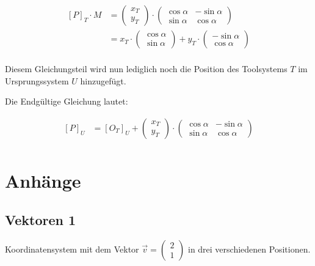 \documentclass{article}
\newcommand{\m}[1]{\begin{pmatrix}#1\end{pmatrix}}
\begin{document}
    \[
        \begin{split}
            {[P]}_{T} \cdot M &= \m{x_T \\ y_T} \cdot \m{\cos \alpha & - \sin \alpha \\ \sin \alpha & \cos \alpha} \\
            &= x_T \cdot \m{\cos \alpha \\ \sin \alpha} + y_T \cdot \m{- \sin \alpha \\ \cos \alpha} \\
        \end{split}
    \]

    Diesem Gleichungsteil wird nun lediglich noch die Position des Toolsystems $T$ im Ursprungssystem $U$ hinzugefügt.

    Die Endgültige Gleichung lautet:

    \[
        \begin{split}
            {[P]}_U &= {[O_T]}_U + \m{x_T \\ y_T} \cdot \m{\cos \alpha & - \sin \alpha \\ \sin \alpha & \cos \alpha} \\
        \end{split}
    \]
    


    \newpage

    \section{Anhänge}

    \subsection{Vektoren 1}
    \begin{figure}[h]
        \centering
    \end{figure}
    Koordinatensystem mit dem Vektor $\vec{v} = \m{2 \\ 1}$ in drei verschiedenen Positionen.
\end{document}

